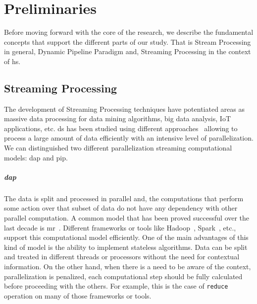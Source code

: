 \chapter{Preliminaries}\label{prelim}
Before moving forward with the core of the research, we describe the fundamental concepts that support the different parts of our study. That is Stream Processing in general, Dynamic Pipeline Paradigm and, Streaming Processing in the context of \acrshort{hs}.

\section{Streaming Processing}
The development of Streaming Processing techniques  have potentiated areas as massive data processing for data mining algorithms, big data analysis, IoT applications, etc.  
\acrfull{ds} has been studied using different approaches~\cite{enumeratingsg, exploiting, onthefly} allowing to process a large amount of data efficiently with an intensive level of parallelization.
We can distinguished two different parallelization streaming computational models: \acrfull{dap} and \acrfull{pip}. 

\paragraph{\acrfull{dap}} The data is split and processed in parallel and, the computations that perform some action over that subset of data do not have any dependency with other parallel computation. 
A common model that has been proved successful over the last decade is \acrfull{mr}~\cite{mapreduce}. Different frameworks or tools like Hadoop~\cite{hadoop}, Spark~\cite{apachespark}, etc., support this computational model efficiently. 
One of the main advantages of this kind of model is the ability to implement stateless algorithms. Data can be split and treated in different threads or processors without the need for contextual information. 
On the other hand, when there is a need to be aware of the context, parallelization is penalized, each computational step should be fully calculated before proceeding with the others. 
For example, this is the case of \texttt{reduce} operation on many of those frameworks or tools.

